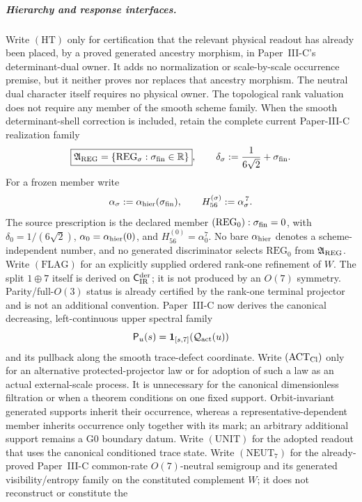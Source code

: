 \documentclass[12pt,a4paper]{article}
\begin{document}
\subparagraph{Hierarchy and response interfaces.}
Write \((\mathrm{HT})\) only for certification that the relevant physical
readout has already been placed, by a proved generated ancestry morphism, in
Paper~III-C's determinant-dual owner.  It adds no normalization or
scale-by-scale occurrence premise, but it neither proves nor replaces that
ancestry morphism.  The neutral dual character itself requires no physical
owner.  The topological rank valuation does not require any member of the smooth
scheme family.  When the smooth determinant-shell correction is included,
retain the complete current Paper-III-C realization family
\[
 \boxed{\mathfrak A_{\rm REG}
 =\{\mathrm{REG}_{\sigma}:\sigma_{\rm fin}\in\mathbb R\}},
 \qquad
 \delta_\sigma:=\frac1{6\sqrt2}+\sigma_{\rm fin}.
\]
For a frozen member write
\[
 \alpha_\sigma:=\alpha_{\rm hier}(\sigma_{\rm fin}),
 \qquad
 H_{56}^{(\sigma)}:=\alpha_\sigma^{\,7}.
\]
The source prescription is the declared member
\((\mathrm{REG}_0):\sigma_{\rm fin}=0\), with
\(\delta_0=1/(6\sqrt2)\),
\(\alpha_0=\alpha_{\rm hier}(0)\), and
\(H_{56}^{(0)}=\alpha_0^7\).  No bare \(\alpha_{\rm hier}\) denotes a
scheme-independent number, and no generated discriminator selects
\(\mathrm{REG}_0\) from \(\mathfrak A_{\rm REG}\).
Write
\((\mathrm{FLAG})\) for an explicitly supplied ordered rank-one refinement of
\(W\).  The split \(1\oplus7\) itself is derived on
\(\mathsf C_{\rm IR}^{\rm der}\); it is not produced by an
\(O(7)\) symmetry.  Parity/full-\(O(3)\) status is already certified by the
rank-one terminal projector and is not an additional convention.
Paper~III-C now derives the canonical decreasing, left-continuous upper
spectral family
\[
 \mathsf P_u(s)=\mathbf1_{[s,7]}(\mathcal Q_{\rm act}(u))
\]
and its pullback along the smooth trace-defect coordinate.  Write
\((\mathrm{ACT}_{\rm Cl})\) only for an alternative protected-projector law or
for adoption of such a law as an actual external-scale process.  It is
unnecessary for the canonical dimensionless filtration or when a theorem
conditions on one fixed support.  Orbit-invariant generated supports inherit their
occurrence, whereas a representative-dependent member inherits occurrence
only together with its mark; an arbitrary additional support remains a G0
boundary datum.  Write \((\mathrm{UNIT})\) for the adopted
readout that uses the canonical conditioned trace state.  Write
\((\mathrm{NEUT}_7)\) for the already-proved Paper~III-C common-rate
\(O(7)\)-neutral semigroup and its generated visibility/entropy family on the
constituted complement \(W\); it does not reconstruct or constitute the
\end{document}

